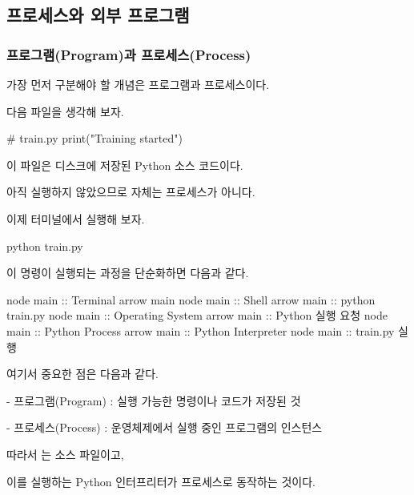 



\subsection{프로세스와 외부 프로그램}

\subsubsection{프로그램(Program)과 프로세스(Process)}

가장 먼저 구분해야 할 개념은 프로그램과 프로세스이다.

다음 파일을 생각해 보자.

\begin{dhkcode}
# train.py
print("Training started")
\end{dhkcode}

이 파일은 디스크에 저장된 Python 소스 코드이다.

아직 실행하지 않았으므로  자체는 프로세스가 아니다.

이제 터미널에서 실행해 보자.

\begin{dhkzsh}
python train.py
\end{dhkzsh}

이 명령이 실행되는 과정을 단순화하면 다음과 같다.

\begin{dhkbranch}[in=8]
node main :: Terminal
arrow main
node main :: Shell
arrow main :: python train.py
node main :: Operating System
arrow main :: Python 실행 요청
node main :: Python Process
arrow main :: Python Interpreter
node main :: train.py 실행
\end{dhkbranch}

여기서 중요한 점은 다음과 같다.

\begin{dhksmry}
    - 프로그램(Program) : 실행 가능한 명령이나 코드가 저장된 것

    - 프로세스(Process) : 운영체제에서 실행 중인 프로그램의 인스턴스
\end{dhksmry}

따라서 는 소스 파일이고,

이를 실행하는 Python 인터프리터가 프로세스로 동작하는 것이다.

